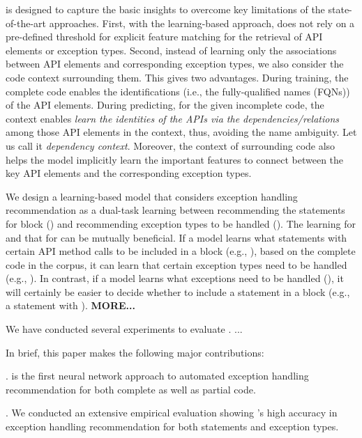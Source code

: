 
{\tool} is designed to capture the basic insights to overcome key
limitations of the state-of-the-art approaches. First, with the
learning-based approach, {\tool} does not rely on a pre-defined
threshold for explicit feature matching for the retrieval of API
elements or exception types. Second, instead of learning only the
associations between API elements and corresponding exception types,
we also consider the code context surrounding them. This gives {\tool}
two advantages. During training, the complete code enables the
identifications (i.e., the fully-qualified names (FQNs)) of the API
elements. During predicting, for the given incomplete code, the
context enables {\tool} {\em learn the identities of the APIs via the
  dependencies/relations} among those API elements in the context,
thus, avoiding the name ambiguity. Let us call it {\em dependency
  context}. Moreover, the context of surrounding code also helps the
model implicitly learn the important features to connect between the
key API elements and the corresponding exception types.

We design a learning-based model that considers exception handling
recommendation as a dual-task learning between recommending the
statements for  block ({\xstate}) and recommending
exception types to be handled ({\xtype}). The learning for {\xstate}
and that for {\xtype} can be mutually beneficial. If a model learns
what statements with certain API method calls to be included in a
 block (e.g., ), based on the
complete code in the corpus, it can learn that certain exception types
need to be handled (e.g., ). In contrast, if a model
learns what exceptions need to be handled
(), it will certainly be
easier to decide whether to include a statement in a 
block (e.g., a statement with
). {\bf MORE...}

We have conducted several experiments to evaluate {\tool}. ...

In brief, this paper makes the following major contributions:

. {\tool} is the first neural network approach to
  automated exception handling recommendation for both complete as
  well as partial code.

. We conducted an extensive
empirical evaluation showing {\tool}'s high accuracy in exception
handling recommendation for both statements and exception types.

  
